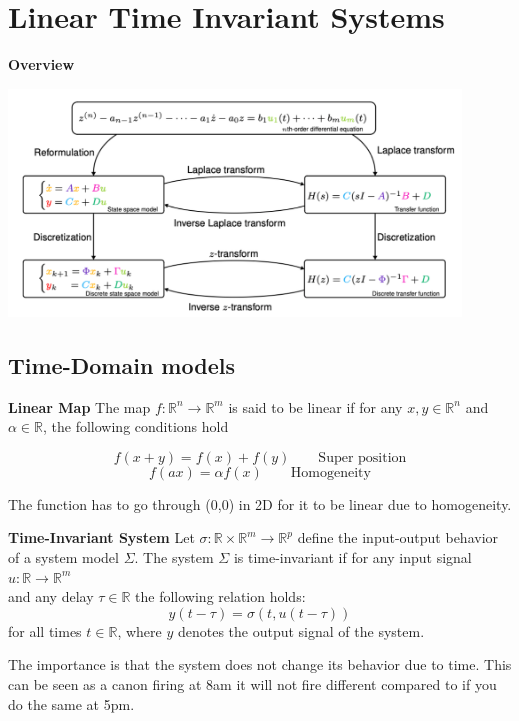 \section{Linear Time Invariant Systems}
\textbf{Overview}

\begin{center}
	\includegraphics[width=0.9\textwidth]{Images/Models.png}
\end{center}
\subsection{Time-Domain models}



\textbf{Linear Map} \newline
The map $f: \mathbb{R}^n \to  \mathbb{R}^m$ is said to be linear if for any $x,y \in \mathbb{R}^n$ and
$\alpha \in \mathbb{R}$, the following conditions hold

$$f(x+y) = f(x) + f(y)  \qquad \text{Super position}$$
$$f(ax) = \alpha f(x) \qquad \text{Homogeneity}$$

The function has to go through (0,0) in 2D for it to be linear due to homogeneity.


\textbf{Time-Invariant System} \newline
Let $\sigma: \mathbb{R}\times \mathbb{R}^m \to \mathbb{R}^p$ define the input-output behavior of a system model $\Sigma$.
The system $\Sigma$ is time-invariant if for any input signal $u:\mathbb{R}\to \mathbb{R}^m$\\
and any delay $\tau \in \mathbb{R}$ the following relation holds:
$$ y(t-\tau)= \sigma(t,u(t-\tau))$$
for all times $t\in \mathbb{R}$, where $y$ denotes the output signal of the system.

The importance is that the system does not change its behavior due to time.
This can be seen as a canon firing at 8am it will not fire different
compared to if you do the same at 5pm.


